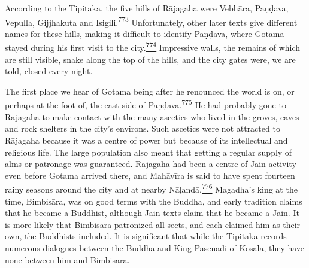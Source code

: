 \begin{description}
According to the Tipitaka, the five hills of Rājagaha were Vebhāra,
Paṇḍava, Vepulla, Gijjhakuta and
Isigili.\label{footprints_split_019.html_fnref773}\hyperref[footprints_split_025.htmlux5cux23fn773]{\textsuperscript{773}}
Unfortunately, other later texts give different names for these hills,
making it difficult to identify Paṇḍava, where Gotama stayed during his
first visit to the
city.\label{footprints_split_019.html_fnref774}\hyperref[footprints_split_025.htmlux5cux23fn774]{\textsuperscript{774}}
Impressive walls, the remains of which are still visible, snake along
the top of the hills, and the city gates were, we are told, closed every
night.

The first place we hear of Gotama being after he renounced the world is
on, or perhaps at the foot of, the east side of
Paṇḍava.\label{footprints_split_019.html_fnref775}\hyperref[footprints_split_025.htmlux5cux23fn775]{\textsuperscript{775}}
He had probably gone to Rājagaha to make contact with the many ascetics
who lived in the groves, caves and rock shelters in the city's environs.
Such ascetics were not attracted to Rājagaha because it was a centre of
power but because of its intellectual and religious life. The large
population also meant that getting a regular supply of alms or patronage
was guaranteed. Rājagaha had been a centre of Jain activity even before
Gotama arrived there, and Mahāvīra is said to have spent fourteen rainy
seasons around the city and at nearby
Nāḷandā.\label{footprints_split_019.html_fnref776}\hyperref[footprints_split_025.htmlux5cux23fn776]{\textsuperscript{776}}
Magadha's king at the time, Bimbisāra, was on good terms with the
Buddha, and early tradition claims that he became a Buddhist, although
Jain texts claim that he became a Jain. It is more likely that Bimbisāra
patronized all sects, and each claimed him as their own, the Buddhists
included. It is significant that while the Tipitaka records numerous
dialogues between the Buddha and King Pasenadi of Kosala, they have none
between him and Bimbisāra.


\end{description}
